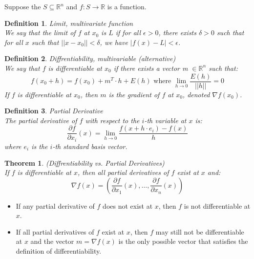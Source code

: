 \documentclass[11pt]{book} %
\newtheorem{theorem}{Theorem}[section]
\newtheorem{definition}{Definition}[section]
\begin{document}
\bigbreak

Suppose the $S \subseteq \mathbb{R}^n$ and $f: S \rightarrow \mathbb{R}$ is a function. 

\bigbreak

\begin{definition}{Limit, multivariate function} \\
We say that the limit of $f$ at $x_0$ is $L$ if for all $\epsilon > 0$, there exists $\delta > 0$ such that 
for all $x$ such that $||x - x_0|| < \delta$, we have $|f(x) - L| < \epsilon$.
\end{definition}

\begin{definition}{Diffrentiability, multivariable (alternative)} \\
We say that $f$ is differentiable at $x_0$ if there exists a vector m $\in \mathbb{R}^n$ such that:
\begin{equation}
    f(x_0 + h) = f(x_0) + m^T \cdot h + E(h) \text{ where } \lim_{h \rightarrow 0} \frac{E(h)}{||h||} = 0
\end{equation}
If $f$ is differentiable at $x_0$, then $m$ is the gradient of $f$ at $x_0$, denoted $\nabla f(x_0)$.
\end{definition}

\bigbreak

\begin{definition}{Partial Derivative} \\
The partial derivative of $f$ with respect to the $i$-th variable at $x$ is:
\begin{equation}
    \frac{\partial f}{\partial x_i}(x) = \lim_{h \rightarrow 0} \frac{f(x + h \cdot e_i) - f(x)}{h}
\end{equation}
where $e_i$ is the $i$-th standard basis vector.
\end{definition}

\bigbreak

\begin{theorem}(Diffrentiability vs. Partial Derivatives) \\
If $f$ is differentiable at $x$, then all partial derivatives of $f$ exist at $x$ and:
\begin{equation}
    \nabla f(x) = \left( \frac{\partial f}{\partial x_1}(x), \ldots, \frac{\partial f}{\partial x_n}(x) \right)
\end{equation}    
\end{theorem}

\bigbreak

\begin{itemize}
    \item If any partial derivative of $f$ does not exist at $x$, then $f$ is not differentiable at $x$.
    \item If all partial derivatives of $f$ exist at $x$, then $f$ may still not be differentiable at $x$ 
    and the vector $m = \nabla f(x)$ is the only possible vector that satisfies the definition of differentiability.
\end{itemize}
\end{document}
